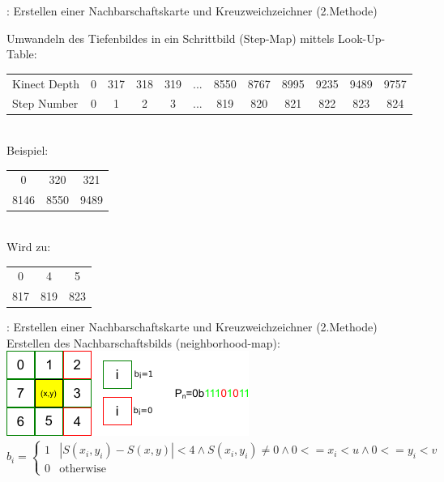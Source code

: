 \documentclass{VLKlauck}
\begin{document}
	 	
	\begin{frame}{\insertsubsection: Erstellen einer Nachbarschaftskarte und Kreuzweichzeichner (2.Methode)}

	Umwandeln des Tiefenbildes in ein Schrittbild (Step-Map) mittels Look-Up-Table:\\[0.5cm]
	{
	\tiny
		  \begin{tabular}{lccccccccccc}
			Kinect Depth& 0 & 317 & 318 & 319 &  ...  & 8550 & 8767 & 8995 & 9235 & 9489 & 9757\\
			Step Number & 0 &   1 &   2 &   3 &  ...  &  819 &  820 &  821 &  822 & 823  & 824\\
		  \end{tabular}
	}\\[0.5cm]

			Beispiel:\\
			\begin{tabular}{ccc} 
			0 & 320 & 321\\
			8146 & 8550 & 9489\\
			\end{tabular}\\[0.5cm]

			Wird zu:\\
			\begin{tabular}{ccc}
			0 & 4 & 5\\
			817 & 819 & 823\\
			\end{tabular}
	\end{frame}
	 
	\begin{frame}{\insertsubsection: Erstellen einer Nachbarschaftskarte und Kreuzweichzeichner (2.Methode)}
	 	Erstellen des Nachbarschaftsbilds (neighborhood-map):\\[0.5cm]
	 	\includegraphics[width=\textwidth]{neighborhoodmap.pdf}\\
	 	{\tiny
	 	$$
	 	 b_i = \left\{ 
	 	\begin{array}{ll}
	         1 & \left|S(x_i,y_i)-S(x,y)\right|<4  \wedge   S(x_i,y_i) \neq 0 \wedge 0<=x_i<u  \wedge 0<=y_i<v\\
	         0 & \mbox{otherwise} 
	 	\end{array}
		\right.   
	 	$$
	 	}
	\end{frame}
	  
\end{document}
